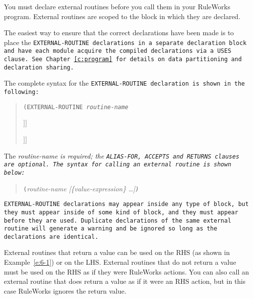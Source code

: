 You must declare external routines before you call them in your
RuleWorks program.  External routines are scoped to the block in which
they are declared.

The easiest way to ensure that the correct declarations have been made
is to place the \tt{EXTERNAL-ROUTINE} declarations in a separate
declaration block and have each module acquire the compiled
declarations via a \tt{USES} clause. See Chapter~\ref{c:program} for
details on data partitioning and declaration sharing.

The complete syntax for the \tt{EXTERNAL-ROUTINE} declaration is shown
in the following:

\begin{quote}
\tt{(EXTERNAL-ROUTINE} \it{routine-name}\par
{}\par
\qquad\qquad[\verb|<|\it{formal-parameter-name}\verb|>| [\tt[\it{size}\tt]]]\par
{}\par
\qquad{}\par
\qquad\qquad[\verb|<|\it{formal-parameter-name}\verb|>| [\tt[\it{size}\tt]]]\par
{}\par
\qquad{}\par
\end{quote}

The \it{routine-name} is required; the \tt{ALIAS-FOR}, \tt{ACCEPTS}
and \tt{RETURNS} clauses are optional.  The syntax for calling an
external routine is shown below:

\begin{quote}
\verb|(|\it{routine-name} [\{\it{value-expression}\} \ldots]\verb|)|
\end{quote}

\tt{EXTERNAL-ROUTINE} declarations may appear inside any type of block, but
they must appear inside of some kind of block, and they must appear
before they are used. Duplicate declarations of the same external
routine will generate a warning and be ignored so long as the
declarations are identical.

External routines that return a value can be used on the RHS (as shown
in Example~\ref{e:6-1}) or on the LHS. External routines that do not return a
value must be used on the RHS as if they were RuleWorks actions. You
can also call an external routine that does return a value as if it
were an RHS action, but in this case RuleWorks ignores the return
value.

